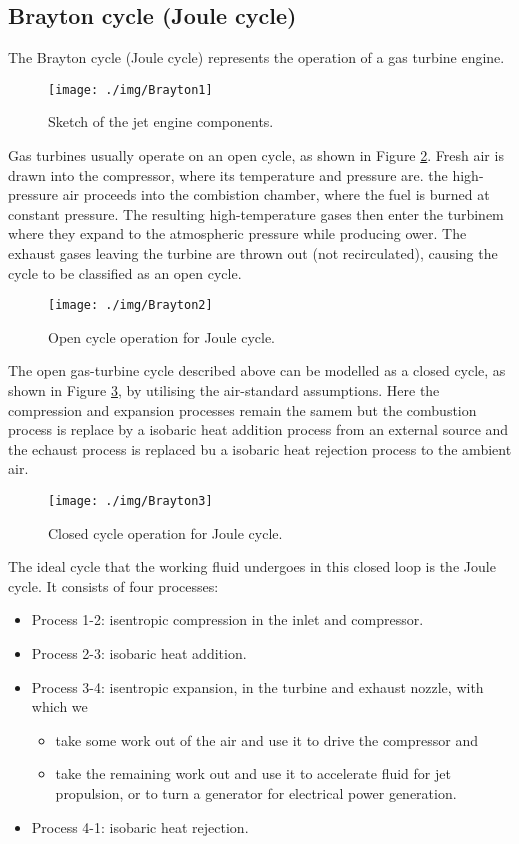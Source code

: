 \subsection{Brayton cycle (Joule cycle)}
The Brayton cycle (Joule cycle) represents the operation of a gas turbine engine.
\begin{figure}
  \centering
  \texttt{[image: ./img/Brayton1]}
  \caption{Sketch of the jet engine components.}
  \label{brayton1}
\end{figure}
Gas turbines usually operate on an open cycle, as shown in Figure \ref{brayton2}. Fresh air is drawn into the compressor, where its temperature and pressure are. the high-pressure air proceeds into the combistion chamber, where the fuel is burned at constant pressure. The resulting high-temperature gases then enter the turbinem where they expand to the atmospheric pressure while producing ower.  The exhaust gases leaving the turbine are thrown out (not recirculated), causing the cycle to be classified as an open cycle.
\begin{figure}
  \centering
  \texttt{[image: ./img/Brayton2]}
  \caption{Open cycle operation for Joule cycle.}
  \label{brayton2}
\end{figure}
The open gas-turbine cycle described above can be modelled as a closed cycle, as shown in Figure \ref{brayton3}, by utilising the air-standard assumptions. Here the compression and expansion processes remain the samem but the combustion process is replace by a isobaric heat addition process from an external source and the echaust process is replaced bu a isobaric heat rejection process to the ambient air.
\begin{figure}
  \centering
  \texttt{[image: ./img/Brayton3]}
  \caption{Closed cycle operation for Joule cycle.}
  \label{brayton3}
\end{figure}
The ideal cycle that the working fluid undergoes in this closed loop is the Joule cycle. It consists of four processes:
\begin{itemize}[noitemsep]
  \item Process 1-2: isentropic compression in the inlet and compressor.
  \item Process 2-3: isobaric heat addition.
  \item Process 3-4: isentropic expansion, in the turbine and exhaust nozzle, with which we
        \begin{itemize}[noitemsep]
          \item take some work out of the air and use it to drive the compressor and
          \item take the remaining work out and use it to accelerate fluid for jet propulsion, or to turn a generator for electrical power generation.
        \end{itemize}
  \item Process 4-1: isobaric heat rejection.
\end{itemize}

